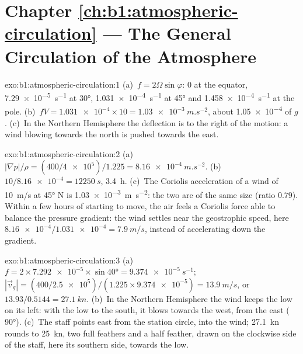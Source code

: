 \section*{Chapter \ref{ch:b1:atmospheric-circulation} --- The General Circulation of the Atmosphere}

\begin{solution}{exo:b1:atmospheric-circulation:1}
(a)~$f = 2\Omega\sin\varphi$: $0$ at the equator, \qty{7.29e-5}{s^{-1}} at \ang{30},
\qty{1.031e-4}{s^{-1}} at \ang{45} and \qty{1.458e-4}{s^{-1}} at the pole.
(b)~$fV = \num{1.031e-4} \times 10 = \qty{1.03e-3}{m.s^{-2}}$, about \num{1.05e-4}
of $g$. (c)~In the Northern Hemisphere the deflection is to the right of the motion:
a wind blowing towards the north is pushed towards the east.
\end{solution}

\begin{solution}{exo:b1:atmospheric-circulation:2}
(a)~$|\nabla p|/\rho = (400/\num{4e5})/1.225 = \qty{8.16e-4}{m.s^{-2}}$.
(b)~$10/\num{8.16e-4} = \qty{12250}{s}$, \qty{3.4}{h}. (c)~The Coriolis acceleration
of a wind of \qty{10}{m/s} at \ang{45} N is \qty{1.03e-3}{m.s^{-2}}: the two are of
the same size (ratio $0.79$). Within a few hours of starting to move, the air feels a
Coriolis force able to balance the pressure gradient: the wind settles near the
geostrophic speed, here $\num{8.16e-4}/\num{1.031e-4} = \qty{7.9}{m/s}$, instead of
accelerating down the gradient.
\end{solution}

\begin{solution}{exo:b1:atmospheric-circulation:3}
(a)~$f = 2 \times \num{7.292e-5} \times \sin\ang{40} = \qty{9.374e-5}{s^{-1}}$;
$|\vec v_g| = (400/\num{2.5e5})/(1.225 \times \num{9.374e-5}) = \qty{13.9}{m/s}$, or
$13.93/0.5144 = \qty{27.1}{kn}$. (b)~In the Northern Hemisphere the wind keeps the
low on its left: with the low to the south, it blows towards the west, from the east
( \ang{90}). (c)~The staff points east from the station circle, into the
wind; \qty{27.1}{kn} rounds to \qty{25}{kn}, two full feathers and a half feather,
drawn on the clockwise side of the staff, here its southern side, towards the low.
\end{solution}

